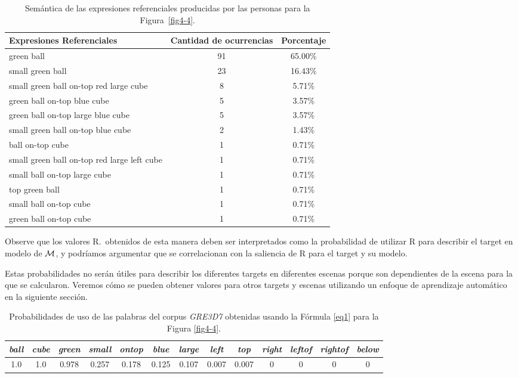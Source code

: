 \begin{table}[h!]
\begin{center}
\begin{tabular}{|l|c|c|}
\hline
Expresiones Referenciales & Cantidad de ocurrencias & Porcentaje \\
\hline

green ball & 91 & 65.00\% \\
small green ball   & 23 & 16.43\% \\
small green ball on-top red large cube & 8 & 5.71\% \\
green ball on-top blue cube & 5 & 3.57\% \\
green ball on-top large blue cube & 5 & 3.57\% \\
small green ball on-top blue cube & 2 & 1.43\% \\
ball on-top cube & 1 & 0.71\% \\
small green ball on-top red large left cube  & 1 & 0.71\% \\
small ball on-top large cube & 1 & 0.71\% \\
top green ball  & 1 & 0.71\% \\
small ball on-top cube & 1 & 0.71\% \\
green ball on-top cube & 1 & 0.71\% \\

\hline
\end{tabular}
\caption{Sem\'antica de las expresiones referenciales producidas por las personas para la Figura~\ref{fig4-4}.}\label{corpus-distribution}
\end{center}
\end{table}

Observe que los valores R.\puse\ obtenidos de esta manera deben ser
interpretados como la probabilidad de utilizar R para describir el target en
modelo de $\mathcal{M} $, y podr\'{i}amos argumentar que se correlacionan con la
 saliencia de R para el target y su modelo. 
 
Estas probabilidades no ser\'an \'utiles
para describir los diferentes targets en diferentes escenas porque son dependientes de la escena para la que se calcularon. Veremos c\'omo se
pueden obtener valores para otros targets y escenas utilizando un
enfoque de aprendizaje autom\'atico en la siguiente secci\'on. 


\begin{table}[H]
\begin{center}
\begin{tabular}{ccccccccccccc}
\hline
\it{ball} & \it{cube} &  \it{green} & \it{small} &  \it{ontop} &  \it{blue} &  \it{large} &  \it{left} &  \it{top} &\it{right} &  \it{leftof} &    \it{rightof} &\it{below} \\
\hline

1.0 & 1.0 & 0.978 &0.257 &0.178 & 0.125 &0.107  &0.007  &0.007 & 0 &0&0&0\\
\hline
\end{tabular}
\caption{Probabilidades de uso de las palabras del corpus \textit{GRE3D7} obtenidas usando la F\'ormula \ref{eq1} para la Figura \ref{fig4-4}.}  
\label{probability-of-use1}
\end{center}
\end{table}



